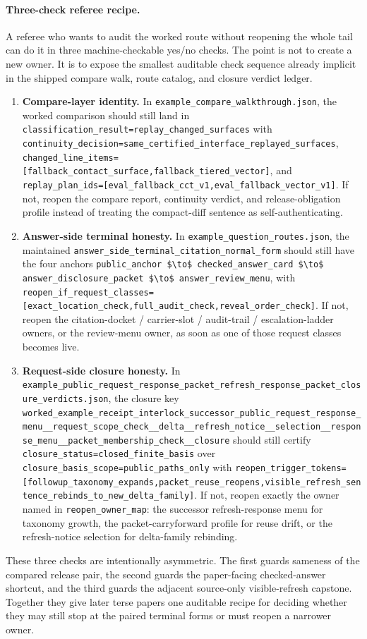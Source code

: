 \documentclass[11pt]{article}
\begin{document}
\paragraph{Three-check referee recipe.}
A referee who wants to audit the worked route without reopening the whole tail can do it in three machine-checkable yes/no checks.
The point is not to create a new owner.
It is to expose the smallest auditable check sequence already implicit in the shipped compare walk, route catalog, and closure verdict ledger.
\begin{enumerate}[leftmargin=1.5em]
\item \textbf{Compare-layer identity.} In \nolinkurl{example\_compare\_walkthrough.json}, the worked comparison should still land in \nolinkurl{classification\_result=replay\_changed\_surfaces} with \nolinkurl{continuity\_decision=same\_certified\_interface\_replayed\_surfaces}, \nolinkurl{changed\_line\_items=[fallback\_contact\_surface,fallback\_tiered\_vector]}, and \nolinkurl{replay\_plan\_ids=[eval\_fallback\_cct\_v1,eval\_fallback\_vector\_v1]}. If not, reopen the compare report, continuity verdict, and release-obligation profile instead of treating the compact-diff sentence as self-authenticating.
\item \textbf{Answer-side terminal honesty.} In \nolinkurl{example\_question\_routes.json}, the maintained \nolinkurl{answer\_side\_terminal\_citation\_normal\_form} should still have the four anchors \nolinkurl{public\_anchor $\to$ checked\_answer\_card $\to$ answer\_disclosure\_packet $\to$ answer\_review\_menu}, with \nolinkurl{reopen\_if\_request\_classes=[exact\_location\_check,full\_audit\_check,reveal\_order\_check]}. If not, reopen the citation-docket / carrier-slot / audit-trail / escalation-ladder owners, or the review-menu owner, as soon as one of those request classes becomes live.
\item \textbf{Request-side closure honesty.} In \nolinkurl{example\_public\_request\_response\_packet\_refresh\_response\_packet\_closure\_verdicts.json}, the closure key \nolinkurl{worked\_example\_receipt\_interlock\_successor\_public\_request\_response\_menu\_\_request\_scope\_check\_\_delta\_\_refresh\_notice\_\_selection\_\_response\_menu\_\_packet\_membership\_check\_\_closure} should still certify \nolinkurl{closure\_status=closed\_finite\_basis} over \nolinkurl{closure\_basis\_scope=public\_paths\_only} with \nolinkurl{reopen\_trigger\_tokens=[followup\_taxonomy\_expands,packet\_reuse\_reopens,visible\_refresh\_sentence\_rebinds\_to\_new\_delta\_family]}. If not, reopen exactly the owner named in \nolinkurl{reopen\_owner\_map}: the successor refresh-response menu for taxonomy growth, the packet-carryforward profile for reuse drift, or the refresh-notice selection for delta-family rebinding.
\end{enumerate}
\noindent These three checks are intentionally asymmetric.
The first guards sameness of the compared release pair, the second guards the paper-facing checked-answer shortcut, and the third guards the adjacent source-only visible-refresh capstone.
Together they give later terse papers one auditable recipe for deciding whether they may still stop at the paired terminal forms or must reopen a narrower owner.
\end{document}
